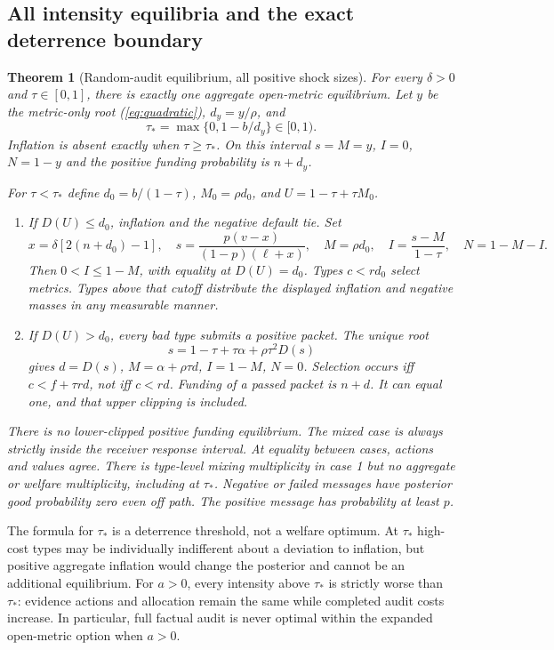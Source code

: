 \documentclass[11pt]{article}
\newtheorem{theorem}{Theorem}
\begin{document}
\subsection{All intensity equilibria and the exact deterrence boundary}\label{subsec:random_eq}
\begin{theorem}[Random-audit equilibrium, all positive shock sizes]\label{thm:random_eq}
For every $\delta>0$ and $\tau\in[0,1]$, there is exactly one aggregate open-metric equilibrium. Let $y$ be the metric-only root (\ref{eq:quadratic}), $d_y=y/\rho$, and
\begin{equation}\tau_* =\max\{0,1-b/d_y\}\in[0,1).\label{eq:taustar}\end{equation}
Inflation is absent exactly when $\tau\geq\tau_*$. On this interval $s=M=y$, $I=0$, $N=1-y$ and the positive funding probability is $n+d_y$.

For $\tau<\tau_*$ define $d_0=b/(1-\tau)$, $M_0=\rho d_0$, and $U=1-\tau+\tau M_0$.
\begin{enumerate}
\item If $D(U)\leq d_0$, inflation and the negative default tie. Set
\begin{equation}
x=\delta[2(n+d_0)-1],\quad s=\frac{p(v-x)}{(1-p)(\ell+x)},\quad M=\rho d_0,\quad I=\frac{s-M}{1-\tau},\quad N=1-M-I.\label{eq:randommix}
\end{equation}
Then $0<I\leq1-M$, with equality at $D(U)=d_0$. Types $c<rd_0$ select metrics. Types above that cutoff distribute the displayed inflation and negative masses in any measurable manner.
\item If $D(U)>d_0$, every bad type submits a positive packet. The unique root
\begin{equation}s=1-\tau+\tau\alpha+\rho\tau^2D(s)\label{eq:randomstrict}
\end{equation}
gives $d=D(s)$, $M=\alpha+\rho\tau d$, $I=1-M$, $N=0$. Selection occurs iff $c<f+\tau rd$, not iff $c<rd$. Funding of a passed packet is $n+d$. It can equal one, and that upper clipping is included.
\end{enumerate}
There is no lower-clipped positive funding equilibrium. The mixed case is always strictly inside the receiver response interval. At equality between cases, actions and values agree. There is type-level mixing multiplicity in case 1 but no aggregate or welfare multiplicity, including at $\tau_*$. Negative or failed messages have posterior good probability zero even off path. The positive message has probability at least $p$.
\end{theorem}
The formula for $\tau_*$ is a deterrence threshold, not a welfare optimum. At $\tau_*$ high-cost types may be individually indifferent about a deviation to inflation, but positive aggregate inflation would change the posterior and cannot be an additional equilibrium. For $a>0$, every intensity above $\tau_*$ is strictly worse than $\tau_*$: evidence actions and allocation remain the same while completed audit costs increase. In particular, full factual audit is never optimal within the expanded open-metric option when $a>0$.
\end{document}
